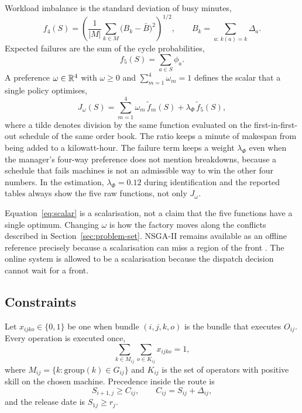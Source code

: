 Workload imbalance is the standard deviation of busy minutes,
\begin{equation}
f_4(S) = \left(\frac{1}{|M|}\sum_{k \in M}\big(B_k - \bar B\big)^2\right)^{1/2}, \qquad B_k = \sum_{a:\,k(a)=k} \Delta_a .
\label{eq:f4}
\end{equation}
Expected failures are the sum of the cycle probabilities,
\begin{equation}
f_5(S) = \sum_{a \in S} \phi_a .
\label{eq:f5}
\end{equation}
A preference \(\omega \in \mathbb{R}^4\) with \(\omega \ge 0\) and \(\sum_{m=1}^{4}\omega_m = 1\) defines the scalar that a single policy optimises,
\begin{equation}
J_\omega(S) = \sum_{m=1}^{4} \omega_m \, \tilde f_m(S) + \lambda_\Phi \, \tilde f_5(S) ,
\label{eq:scalar}
\end{equation}
where a tilde denotes division by the same function evaluated on the first-in-first-out schedule of the same order book. The ratio keeps a minute of makespan from being added to a kilowatt-hour. The failure term keeps a weight \(\lambda_\Phi\) even when the manager's four-way preference does not mention breakdowns, because a schedule that fails machines is not an admissible way to win the other four numbers. In the estimation, \(\lambda_\Phi = 0.12\) during identification and the reported tables always show the five raw functions, not only \(J_\omega\).

Equation~\eqref{eq:scalar} is a scalarisation, not a claim that the five functions have a single optimum. Changing \(\omega\) is how the factory moves along the conflicts described in Section~\ref{sec:problem-set}. NSGA-II remains available as an offline reference precisely because a scalarisation can miss a region of the front \cite{deb2002}. The online system is allowed to be a scalarisation because the dispatch decision cannot wait for a front.

\subsection{Constraints}

Let \(x_{ijko} \in \{0,1\}\) be one when bundle \((i,j,k,o)\) is the bundle that executes \(O_{ij}\). Every operation is executed once,
\begin{equation}
\sum_{k \in M_{ij}} \sum_{o \in K_{ij}} x_{ijko} = 1 ,
\label{eq:assign-once}
\end{equation}
where \(M_{ij} = \{k : \mathrm{group}(k) \in G_{ij}\}\) and \(K_{ij}\) is the set of operators with positive skill on the chosen machine. Precedence inside the route is
\begin{equation}
S_{i+1,j} \ge C_{ij} , \qquad C_{ij} = S_{ij} + \Delta_{ij} ,
\label{eq:precedence}
\end{equation}
and the release date is \(S_{1j} \ge r_j\).


